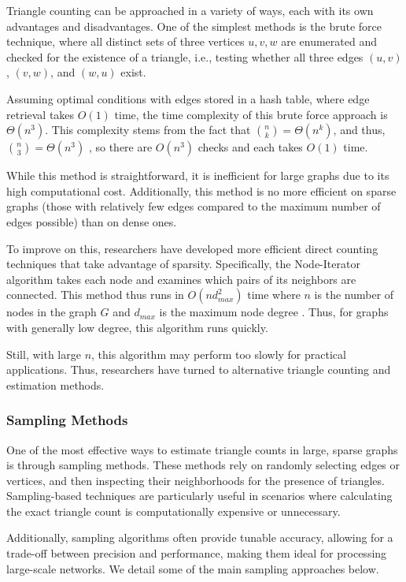 \documentclass[11pt, margin=1in]{article}
\begin{document}
Triangle counting can be approached in a variety of ways, each with its own advantages and disadvantages. 
One of the simplest methods is the brute force technique, where all distinct sets of three vertices ${u, v, w}$ are enumerated and checked for the existence of a triangle, i.e., testing whether all three edges $(u, v)$, $(v, w)$, and $(w, u)$ exist. 

Assuming optimal conditions with edges stored in a hash table, where edge retrieval takes $O(1)$ time, the time complexity of this brute force approach is $\Theta(n^3)$. 
This complexity stems from the fact that ${n \choose k} = \Theta(n^k)$, and thus, ${n \choose 3} = \Theta(n^3)$ \cite{al_hasan_triangle_2018}, so there are $O(n^3)$ checks and each takes $O(1)$ time. 

While this method is straightforward, it is inefficient for large graphs due to its high computational cost.
Additionally, this method is no more efficient on sparse graphs (those with relatively few edges compared to the maximum number of edges possible) than on dense ones.

To improve on this, researchers have developed more efficient direct counting techniques that take advantage of sparsity.
Specifically, the Node-Iterator \cite{schank_finding_2005} algorithm takes each node and examines which pairs of its neighbors are connected.
This method thus runs in $O(nd^2_{max})$ time where $n$ is the number of nodes in the graph $G$ and $d_{max}$ is the maximum node degree \cite{schank_finding_2005}.
Thus, for graphs with generally low degree, this algorithm runs quickly.

Still, with large $n$, this algorithm may perform too slowly for practical applications.
Thus, researchers have turned to alternative triangle counting and estimation methods.

\subsubsection{Sampling Methods}

One of the most effective ways to estimate triangle counts in large, sparse graphs is through sampling methods.
These methods rely on randomly selecting edges or vertices, and then inspecting their neighborhoods for the presence of triangles.
Sampling-based techniques are particularly useful in scenarios where calculating the exact triangle count is computationally expensive or unnecessary.

Additionally, sampling algorithms often provide tunable accuracy, allowing for a trade-off between precision and performance, making them ideal for processing large-scale networks.
We detail some of the main sampling approaches below.
\end{document}
